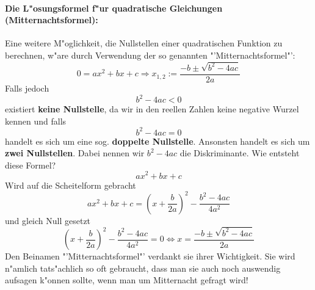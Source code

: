 \paragraph{Die L"osungsformel f"ur quadratische Gleichungen (Mitternachtsformel):}
Eine weitere M"oglichkeit, die Nullstellen einer quadratischen Funktion zu berechnen, w"are durch Verwendung der so genannten "'Mitternachtsformel"':
\begin{equation*}
0 = ax^2 + bx + c \Rightarrow x_{1,2} := \frac{-b \pm \sqrt{b^2 - 4ac}}{2a}
\end{equation*}
Falls jedoch 
\begin{equation*}
b^2 - 4ac < 0
\end{equation*}
existiert \textbf{keine Nullstelle}, da wir in den reellen Zahlen keine negative Wurzel kennen und falls
\begin{equation*}
b^2 - 4ac = 0
\end{equation*}
handelt es sich um eine sog. \textbf{doppelte Nullstelle}. Ansonsten handelt es sich um \textbf{zwei Nullstellen}. Dabei nennen wir $b^2 - 4ac$ die Diskriminante.
Wie entsteht diese Formel?
\begin{equation*}
 ax^2 + bx + c 
\end{equation*}
Wird auf die Scheitelform gebracht
\begin{equation*}
 ax^2 + bx + c  = \left(x + \frac{b}{2a} \right)^2 - \frac{b^2-4ac}{4a^2}
\end{equation*}
und gleich Null gesetzt
\begin{equation*}
\left(x + \frac{b}{2a}\right)^2 - \frac{b^2-4ac}{4a^2} = 0 \iff x = \frac{-b \pm \sqrt{b^2 - 4ac}}{2a}
\end{equation*}
Den Beinamen "'Mitternachtsformel"' verdankt sie ihrer Wichtigkeit. Sie wird n"amlich tats"achlich so oft gebraucht, dass man sie auch noch auswendig aufsagen k"onnen sollte, wenn man um Mitternacht gefragt wird!%

